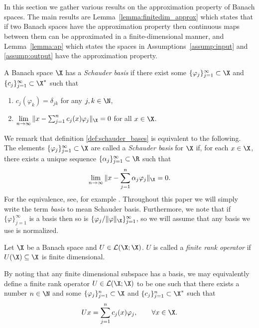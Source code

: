 



\section{}
\label{sec:appendix_approximationproperty}

In this section we gather various results on the approximation property of Banach spaces.
The main results are Lemma~\ref{lemma:finitedim_approx} which  states that if two Banach spaces have
the approximation property then continuous maps between them can be approximated in a 
finite-dimensional manner, and Lemma~\ref{lemma:ap} which states the spaces in Assumptions~\ref{assump:input}
and \ref{assump:output} have the approximation property.

\begin{definition}
\label{def:schauder_bases}
A Banach space \(\X\) has a \textit{Schauder basis} if there exist some \(\{\varphi_j\}_{j=1}^\infty \subset \X\) and \(\{c_j\}_{j=1}^\infty \subset \X^*\)
such that 
\begin{enumerate}
	\item \(c_j(\varphi_k) = \delta_{jk}\) for any \(j,k \in \N\),
	\item \(\lim\limits_{n \to \infty} \|x - \sum_{j=1}^n c_j(x) \varphi_j \|_\X = 0\) for all \(x \in \X\).
\end{enumerate}
\end{definition}
We remark that definition \ref{def:schauder_bases} is equivalent to the following. The elements \(\{\varphi_j\}_{j=1}^\infty \subset \X\)
are called a \textit{Schauder basis} for \(\X\) if, for each \(x \in \X\), there exists a unique sequence \(\{\alpha_j\}_{j=1}^\infty \subset \R\)
such that
\[\lim_{n \to \infty} \|x - \sum_{j=1}^n \alpha_j \varphi_j\|_\X = 0.\]
For the equivalence, see, for example \cite[Theorem 1.1.3]{albiac2006topics}. Throughout
this paper we will simply write the
term \textit{basis} to mean Schauder basis. Furthermore, we note that if \(\{\varphi\}_{j=1}^\infty\) is a basis 
then so is \(\{\varphi_j / \|\varphi\|_{\X}\}_{j=1}^\infty\), so we will assume that any basis we use is normalized.

\begin{definition}
\label{def:finiterank}
Let \(\X\) be a Banach space and \(U \in \mathcal{L}(\X;\X)\). \(U\) is called a \textit{finite rank operator}
if \(U(\X) \subseteq \X\) is finite dimensional. 
\end{definition}
By noting that any finite dimensional subspace has a basis,
we may equivalently define a finite rank operator \(U \in \mathcal{L}(\X;\X)\) to be one such that
there exists a number \(n \in \N\) and some \(\{\varphi_j\}_{j=1}^n \subset \X\) and \(\{c_j\}_{j=1}^n \subset \X^*\)
such that
\[Ux = \sum_{j=1}^n c_j(x) \varphi_j, \qquad  \forall x \in \X.\]



